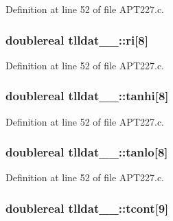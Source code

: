 Definition at line 52 of file A\+P\+T227.\+c.

\subsubsection[{\texorpdfstring{ri}{ri}}]{\setlength{\rightskip}{0pt plus 5cm}doublereal tlldat\+\_\+\_\+\+::ri\mbox{[}8\mbox{]}}\hypertarget{structtlldat__1___ace668e975926eb80188850f452e70bf5}{}\label{structtlldat__1___ace668e975926eb80188850f452e70bf5}


Definition at line 52 of file A\+P\+T227.\+c.

\subsubsection[{\texorpdfstring{tanhi}{tanhi}}]{\setlength{\rightskip}{0pt plus 5cm}doublereal tlldat\+\_\+\_\+\+::tanhi\mbox{[}8\mbox{]}}\hypertarget{structtlldat__1___a0e3b0acf3a773a6acc876bbaf72fdbed}{}\label{structtlldat__1___a0e3b0acf3a773a6acc876bbaf72fdbed}


Definition at line 52 of file A\+P\+T227.\+c.

\subsubsection[{\texorpdfstring{tanlo}{tanlo}}]{\setlength{\rightskip}{0pt plus 5cm}doublereal tlldat\+\_\+\_\+\+::tanlo\mbox{[}8\mbox{]}}\hypertarget{structtlldat__1___a2681bffc310641d69c866dc6dcefebe3}{}\label{structtlldat__1___a2681bffc310641d69c866dc6dcefebe3}


Definition at line 52 of file A\+P\+T227.\+c.

\subsubsection[{\texorpdfstring{tcont}{tcont}}]{\setlength{\rightskip}{0pt plus 5cm}doublereal tlldat\+\_\+\_\+\+::tcont\mbox{[}9\mbox{]}}\hypertarget{structtlldat__1___a16d8177c13c44f661703a270200c6f84}{}\label{structtlldat__1___a16d8177c13c44f661703a270200c6f84}


